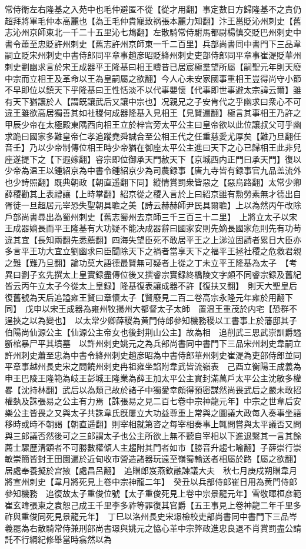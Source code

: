 常侍衛左右隆基之入苑中也毛仲避匿不從【從才用翻】事定數日方歸隆基不之責仍超拜將軍毛仲本高麗也【為王毛仲貴寵致祸張本麗力知翻】汴王邕貶沁州刺史【舊志沁州京師東北一千二十五里沁七鴆翻】左散騎常侍駙馬都尉楊慎交貶巴州刺史中書令蕭至忠貶許州刺史【舊志許州京師東一千二百里】兵部尚書同中書門下三品韋嗣立貶宋州刺史中書侍郎同平章事趙彦昭貶絳州刺史吏部侍郎同平章事崔湜貶華州刺史劉幽求言於宋王成器平王隆基曰相王疇昔已居宸極羣望所屬【嗣聖元年則天廢中宗而立相王及革命以王為皇嗣屬之欲翻】今人心未安家國事重相王豈得尚守小節不早即位以鎮天下乎隆基曰王性恬淡不以代事嬰懷【代事即世事避太宗諱云爾】雖有天下猶讓於人【謂既讓武后又讓中宗也】况親兄之子安肯代之乎幽求曰衆心不可違王雖欲高居獨善其如社稷何成器隆基入見相王【見賢遍翻】極言其事相王乃許之甲辰少帝在太極殿東隅西向相王立於梓宫旁太平公主曰皇帝欲以此位讓叔父可乎幽求跪曰國家多難皇帝仁孝追蹤堯舜誠合至公相王代之任重慈愛尤厚矣【難乃旦翻任音壬】乃以少帝制傳位相王時少帝猶在御座太平公主進曰天下之心已歸相王此非兒座遂提下之【下遐嫁翻】睿宗即位御承天門赦天下【京城西内正門曰承天門】復以少帝為温王以鍾紹京為中書令鍾紹京少為司農録事【唐九寺皆有録事官九品盖流外也少詩照翻】既典朝政【朝直遥翻下同】縱情賞罰衆皆惡之【惡烏路翻】太常少卿薛稷勸其上表禮讓【上時掌翻】紹京從之稷入言於上曰紹京雖有勲勞素無才德出自胥徒一旦超居元宰恐失聖朝具聸之美【詩云赫赫師尹民具爾聸】上以為然丙午改除戶部尚書尋出為蜀州刺史【舊志蜀州去京師三千三百三十二里】　上將立太子以宋王成器嫡長而平王隆基有大功疑不能决成器辭曰國家安則先嫡長國家危則先有功苟違其宜【長知兩翻先悉薦翻】四海失望臣死不敢居平王之上涕泣固請者累日大臣亦多言平王功大宜立劉幽求曰臣聞除天下之禍者當享天下之福平王拯社稷之危救君親之難【難乃旦翻】論功莫大語德最賢無可疑者上從之丁未立平王隆基為太子　【考異曰劉子玄先撰太上皇實録盡傳位後又撰睿宗實録終橋陵文字頗不同睿宗録及舊紀皆云丙午立太子今從太上皇録】隆基復表讓成器不許【復扶又翻】　則天大聖皇后復舊號為天后追謚雍王賢曰章懷太子【賢廢見二百二卷高宗永隆元年雍於用翻下同】　戊申以宋王成器為雍州牧揚州大都督太子太師　置温王重茂於内宅【恐群不逞挾之以為變也】　以太常少卿薛稷為黄門侍郎參知機務稷以工書事上於藩邸其子伯陽尚仙源公主【仙源公主帝女也後封荆山公主】故為相　追削武三思武崇訓爵謚斵棺暴尸平其墳墓　以許州刺史姚元之為兵部尚書同中書門下三品宋州刺史韋嗣立許州刺史蕭至忠為中書令絳州刺史趙彦昭為中書侍郎華州刺史崔湜為吏部侍郎並同平章事越州長史宋之問饒州刺史冉祖雍坐諂附韋武皆流嶺表　己酉立衡陽王成義為申王巴陵王隆範為岐王彭城王隆業為薛王加太平公主實封滿萬戶太平公主沈敏多權畧【沈持林翻】武后以為類己故於諸子中獨愛幸頗得預密謀然尚畏武后之嚴未敢招權埶及誅張易之公主有力焉【誅張易之見二百七卷中宗神龍元年】中宗之世韋后安樂公主皆畏之又與太子共誅韋氏旣屢立大功益尊重上常與之圖議大政每入奏事坐語移時或時不朝謁【朝直遥翻】則宰相就第咨之每宰相奏事上輒問嘗與太平議否又問與三郎議否然後可之三郎謂太子也公主所欲上無不聽自宰相以下進退繫其一言其餘薦士驟歷清顕者不可勝數權傾人主趨附其門者如市【勝音升趨七喻翻】子薛崇行崇敏崇簡皆封王田園遍於近甸收市營造諸器玩遠至嶺蜀輸送者相屬於路【屬之欲翻】居處奉養擬於宫掖【處昌呂翻】　追贈郎岌燕欽融諫議大夫　秋七月庚戍朔贈韋月將宣州刺史【韋月將死見上卷中宗神龍二年】　癸丑以兵部侍郎崔日用為黄門侍郎參知機務　追復故太子重俊位號【太子重俊死見上卷中宗景龍元年】雪敬暉桓彦範崔玄暐張柬之袁恕己成王千里李多祚等罪復其官爵【五王事見上卷神龍二年千里多祚與重俊同死見景龍元年】　丁巳以洛州長史宋璟檢校吏部尚書同中書門下三品岑羲罷為右散騎常侍兼刑部尚書璟與姚元之恊心革中宗弊政進忠良退不肖賞罰盡公請託不行綱紀修舉當時翕然以為